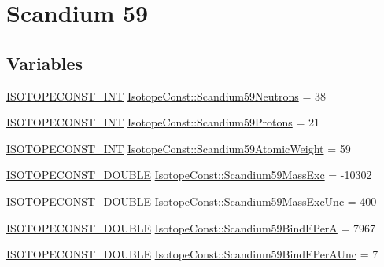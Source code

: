 \hypertarget{group___isotope_const-_scandium-_sc59}{}\section{Scandium 59}
\label{group___isotope_const-_scandium-_sc59}
\subsection*{Variables}
\begin{DoxyCompactItemize}
\item 
\mbox{\hyperlink{group___isotope_const-_macros_ga5f18360b3e99483a35c32d789e62621c}{I\+S\+O\+T\+O\+P\+E\+C\+O\+N\+S\+T\+\_\+\+I\+NT}} \mbox{\hyperlink{group___isotope_const-_scandium-_sc59_gac854270f99a4a39271aded26731b6070}{Isotope\+Const\+::\+Scandium59\+Neutrons}} = 38
\item 
\mbox{\hyperlink{group___isotope_const-_macros_ga5f18360b3e99483a35c32d789e62621c}{I\+S\+O\+T\+O\+P\+E\+C\+O\+N\+S\+T\+\_\+\+I\+NT}} \mbox{\hyperlink{group___isotope_const-_scandium-_sc59_ga30a5b3be93fc45f862ef4019c2b5aca6}{Isotope\+Const\+::\+Scandium59\+Protons}} = 21
\item 
\mbox{\hyperlink{group___isotope_const-_macros_ga5f18360b3e99483a35c32d789e62621c}{I\+S\+O\+T\+O\+P\+E\+C\+O\+N\+S\+T\+\_\+\+I\+NT}} \mbox{\hyperlink{group___isotope_const-_scandium-_sc59_ga44cf9dcc5e543c371bdda03eb4d0d286}{Isotope\+Const\+::\+Scandium59\+Atomic\+Weight}} = 59
\item 
\mbox{\hyperlink{group___isotope_const-_macros_ga8f45a7272ce02c0b4c65c44636ed719a}{I\+S\+O\+T\+O\+P\+E\+C\+O\+N\+S\+T\+\_\+\+D\+O\+U\+B\+LE}} \mbox{\hyperlink{group___isotope_const-_scandium-_sc59_gac531b2f75a519410eb3748ffc054d887}{Isotope\+Const\+::\+Scandium59\+Mass\+Exc}} = -\/10302
\item 
\mbox{\hyperlink{group___isotope_const-_macros_ga8f45a7272ce02c0b4c65c44636ed719a}{I\+S\+O\+T\+O\+P\+E\+C\+O\+N\+S\+T\+\_\+\+D\+O\+U\+B\+LE}} \mbox{\hyperlink{group___isotope_const-_scandium-_sc59_gaff306b90bdf97f9931a2670e1765be34}{Isotope\+Const\+::\+Scandium59\+Mass\+Exc\+Unc}} = 400
\item 
\mbox{\hyperlink{group___isotope_const-_macros_ga8f45a7272ce02c0b4c65c44636ed719a}{I\+S\+O\+T\+O\+P\+E\+C\+O\+N\+S\+T\+\_\+\+D\+O\+U\+B\+LE}} \mbox{\hyperlink{group___isotope_const-_scandium-_sc59_gad63a1afe8b1392f1946108490ac77b1c}{Isotope\+Const\+::\+Scandium59\+Bind\+E\+PerA}} = 7967
\item 
\mbox{\hyperlink{group___isotope_const-_macros_ga8f45a7272ce02c0b4c65c44636ed719a}{I\+S\+O\+T\+O\+P\+E\+C\+O\+N\+S\+T\+\_\+\+D\+O\+U\+B\+LE}} \mbox{\hyperlink{group___isotope_const-_scandium-_sc59_ga80df70959d138b89244425301f19c00b}{Isotope\+Const\+::\+Scandium59\+Bind\+E\+Per\+A\+Unc}} = 7

\end{DoxyCompactItemize}
